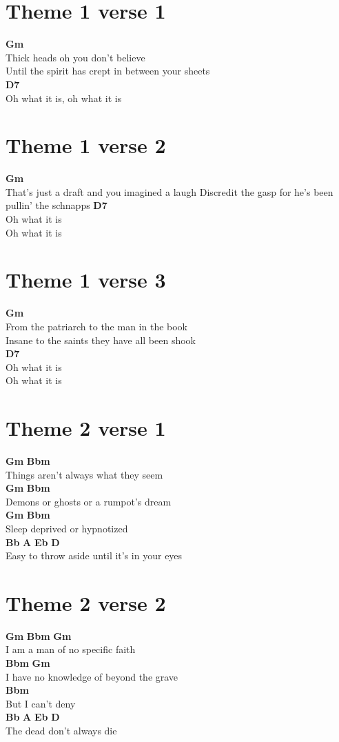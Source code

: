 \documentclass{article}
\begin{document}
\section*{Theme 1 verse 1}
\textbf{Gm}\\
Thick heads oh you don’t believe\\
Until the spirit has crept in between your sheets\\
\textbf{D7}\\
Oh what it is, oh what it is

\section*{Theme 1 verse 2}
\textbf{Gm}\\
That’s just a draft and you imagined a laugh
Discredit the gasp for he’s been pullin’ the schnapps
\textbf{D7}\\
Oh what it is\\
Oh what it is

\section*{Theme 1 verse 3}
         \textbf{Gm}\\
From the patriarch to the man in the book\\
Insane to the saints they have all been shook\\
\textbf{D7}\\
Oh what it is\\
Oh what it is

\section*{Theme 2 verse 1}
\textbf{Gm}                   \textbf{Bbm}\\
Things aren’t always what they seem\\
\textbf{Gm}                  \textbf{Bbm}\\
Demons or ghosts or a rumpot’s dream\\
\textbf{Gm}                \textbf{Bbm}\\
Sleep deprived or hypnotized\\
\textbf{Bb}           \textbf{A}               \textbf{Eb}      \textbf{D}\\
Easy to throw aside until it’s in your eyes

\section*{Theme 2 verse 2}
\textbf{Gm}     \textbf{Bbm}                \textbf{Gm}\\
I am a man of no specific faith\\
\textbf{Bbm}                     \textbf{Gm}\\
I have no knowledge of beyond the grave\\
\textbf{Bbm}\\
But I can’t deny\\
\textbf{Bb}         \textbf{A}      \textbf{Eb} \textbf{D}\\
The dead don’t always die
\end{document}
